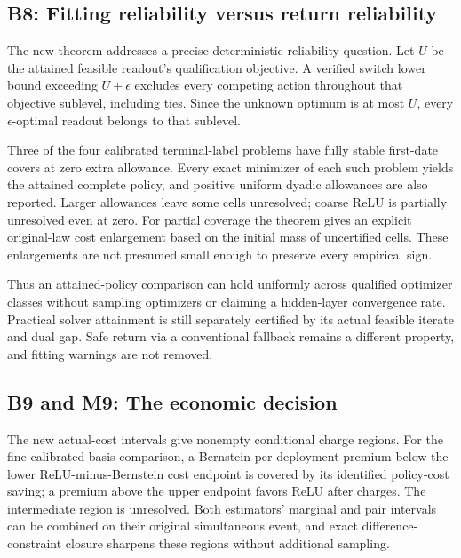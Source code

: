 \documentclass[ecta,nameyear,draft]{econsocart}
\begin{document}
\hypertarget{b8-fitting-reliability-versus-return-reliability}{%
\subsection{B8: Fitting reliability versus return
reliability}\label{b8-fitting-reliability-versus-return-reliability}}

The new theorem addresses a precise deterministic reliability question.
Let \(U\) be the attained feasible readout's qualification objective. A
verified switch lower bound exceeding \(U+\epsilon\) excludes every
competing action throughout that objective sublevel, including ties.
Since the unknown optimum is at most \(U\), every \(\epsilon\)-optimal
readout belongs to that sublevel.

Three of the four calibrated terminal-label problems have fully stable
first-date covers at zero extra allowance. Every exact minimizer of each
such problem yields the attained complete policy, and positive uniform
dyadic allowances are also reported. Larger allowances leave some cells
unresolved; coarse ReLU is partially unresolved even at zero. For
partial coverage the theorem gives an explicit original-law cost
enlargement based on the initial mass of uncertified cells. These
enlargements are not presumed small enough to preserve every empirical
sign.

Thus an attained-policy comparison can hold uniformly across qualified
optimizer classes without sampling optimizers or claiming a hidden-layer
convergence rate. Practical solver attainment is still separately
certified by its actual feasible iterate and dual gap. Safe return via a
conventional fallback remains a different property, and fitting warnings
are not removed.

\hypertarget{b9-and-m9-the-economic-decision}{%
\subsection{B9 and M9: The economic
decision}\label{b9-and-m9-the-economic-decision}}

The new actual-cost intervals give nonempty conditional charge regions.
For the fine calibrated basis comparison, a Bernstein per-deployment
premium below the lower ReLU-minus-Bernstein cost endpoint is covered by
its identified policy-cost saving; a premium above the upper endpoint
favors ReLU after charges. The intermediate region is unresolved. Both
estimators' marginal and pair intervals can be combined on their
original simultaneous event, and exact difference-constraint closure
sharpens these regions without additional sampling.
\end{document}
